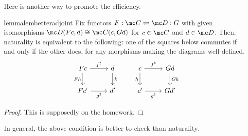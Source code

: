 Here is another way to promote the efficiency.
\begin{restatable}{lemma}{lembetteradjoint} \label{lem:betteradjoint}
	Fix functors $F:\mc C\rightleftharpoons\mc D:G$ with given isomorphisms $\mc D(Fc,d)\cong\mc C(c,Gd)$ for $c\in\mc C$ and $d\in\mc D$. Then, naturality is equivalent to the following: one of the squares below commutes if and only if the other does, for any morphisms making the diagrams well-defined.
	\[\begin{tikzcd}[ampersand replacement=\&]
		Fc \& d \& c \& Gd \\
		{Fc'} \& {d'} \& {c'} \& {Gd'}
		\arrow["{f^\sharp}", from=1-1, to=1-2]
		\arrow["{g^\sharp}"', from=2-1, to=2-2]
		\arrow["Fh"', from=1-1, to=2-1]
		\arrow["k", from=1-2, to=2-2]
		\arrow["h"', from=1-3, to=2-3]
		\arrow["{f^\flat}", from=1-3, to=1-4]
		\arrow["{g^\flat}"', from=2-3, to=2-4]
		\arrow["Gk", from=1-4, to=2-4]
	\end{tikzcd}\]
\end{restatable}
\begin{proof}
	This is supposedly on the homework.
\end{proof}
In general, the above condition is better to check than naturality.

